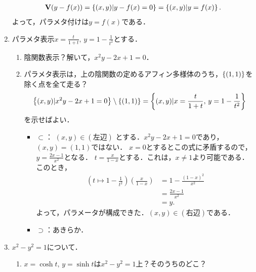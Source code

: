 \documentclass[9pt]{ltjsarticle}
\theoremstyle{break}
\theoremstyle{break}
\theoremstyle{break}
\theoremstyle{break}
\theoremstyle{break}
\theoremstyle{break}
\theoremstyle{break}
\theoremstyle{break}
\theoremstyle{break}
\theoremstyle{break}
\theoremstyle{break}
\theoremstyle{break}
\theoremstyle{break}
\theoremstyle{break}
\theoremstyle{break}
\theoremstyle{nonumberbreak}
\theoremstyle{nonumberbreak}
\begin{document}
\begin{enumerate}[label=(問題\arabic*)]
\begin{align}
 \textbf V(y-f(x)) = \left\{(x,y) | y-f(x)=0\right\} = \left\{(x,y)| y=f(x)\right\}.
\end{align}
よって，パラメタ付けは$y=f(x)$である．
 \item パラメタ表示$x=\frac{t}{1+t},\, y=1-\frac{1}{t^2}$とする．
\begin{enumerate}[label=(\alph*)]
 \item 陰関数表示？解いて，$x^2y-2x+1=0$．
 \item パラメタ表示は，上の陰関数の定めるアフィン多様体のうち，$\left\{(1,1)\right\}$を除く点を全て走る？
\begin{align}
 \left\{(x,y)| x^2y-2x+1=0\right\}\setminus\left\{(1,1)\right\}
= \left\{(x,y) | x=\frac{t}{1+t},\, y = 1-\frac{1}{t^2}\right\}
\end{align}
を示せばよい．
\begin{itemize}
 \item $\subset$：
$(x,y)\in (左辺)$      とする．$x^2y-2x+1=0$であり，$(x,y)=(1,1)$ではない．
$x=0$とするとこの式に矛盾するので，$y=\frac{2x-1}{x^2}$となる．
$t=\frac{x}{1-x}$とする．これは，$x\neq 1$より可能である．
このとき，
\begin{align}
 (t\mapsto 1-\frac{1}{t^2})(\frac{x}{1-x})
&=
1-\frac{(1-x)^2}{x^2}\\
 & =
\frac{2x-1}{x^2}\\
 & =
y.
\end{align}
よって，パラメータが構成できた．$(x,y)\in (右辺)$である．
 \item $\supset$：あきらか．
\end{itemize}
\end{enumerate}
 \item $x^2-y^2=1$について．
\begin{enumerate}[label=(\alph*)]
 \item $x=\cosh t,\, y=\sinh t$は$x^2-y^2=1$上？そのうちのどこ？

\end{enumerate}
\end{enumerate}
\end{document}
